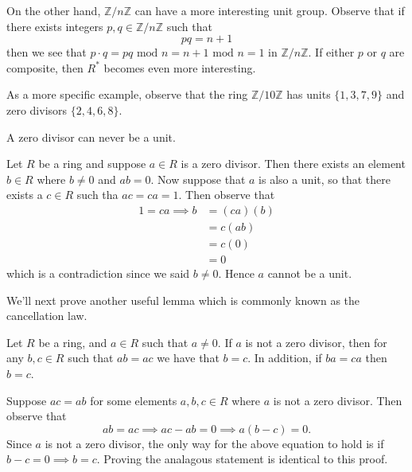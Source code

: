 \documentclass[12pt,letterpaper]{algebra_book}
\newcommand{\ZZ}{\mathbb{Z}}
\theoremstyle{definition}
\begin{document}
    On the other hand, $\ZZ/n\ZZ$ can have a more interesting unit group.
    Observe that if there exists integers $p, q \in \ZZ/n\ZZ$ such that 
    \[
        pq = n +1
    \]
    then we see that $p \cdot q = pq \mbox{ mod } n = n + 1
    \mbox{ mod } n = 1 $ in $\ZZ/n\ZZ$. If either $p$ or $q$ are composite,
    then $R^*$ becomes even more interesting.
    
    As a more specific example, observe that the ring $\ZZ/10\ZZ$
    has units $\{1, 3, 7, 9\}$ and zero divisors $\{2, 4, 6, 8\}$.

    \begin{lemma}
        A zero divisor can never be a unit.
    \end{lemma}

    \begin{prf}
        Let $R$ be a ring and suppose $a \in R$ is a zero divisor.
        Then there exists an element $b \in R$ where $b \ne 0$ and $ab = 0.$
        Now suppose that $a$ is also a unit, so that there exists
        a $c \in R$ such tha $ac = ca = 1$. Then observe that 
        \begin{align*}
            1 = ca \implies b &= (ca)(b)\\
            &= c(ab)\\
            &= c(0)\\
            & = 0
        \end{align*}
        which is a contradiction since we said $b \ne 0$. Hence
        $a$ cannot be a unit.
    \end{prf}

    We'll next prove another useful lemma which is commonly known
    as the cancellation law. 

    \begin{lemma}\label{lemma 2}
        Let $R$ be a ring, and $a \in R$ such that $a \ne 0$. If
        $a$ is not a zero divisor, then for any $b, c \in R$ such
        that $ab = ac$ we have that $b = c$. In addition, if $ba =
        ca$ then $b = c$.
    \end{lemma}

    \begin{prf}
        Suppose $ac = ab$ for some elements $a, b, c \in R$ where
        $a$ is not a zero divisor. Then observe that 
        \[
            ab = ac \implies ac - ab = 0 \implies a(b - c) = 0.
        \]
        Since $a$ is not a zero divisor, the only way for the
        above equation to hold is if $b - c = 0 \implies b = c$.
        Proving the analagous statement is identical to this
        proof. 
    \end{prf}
\end{document}
